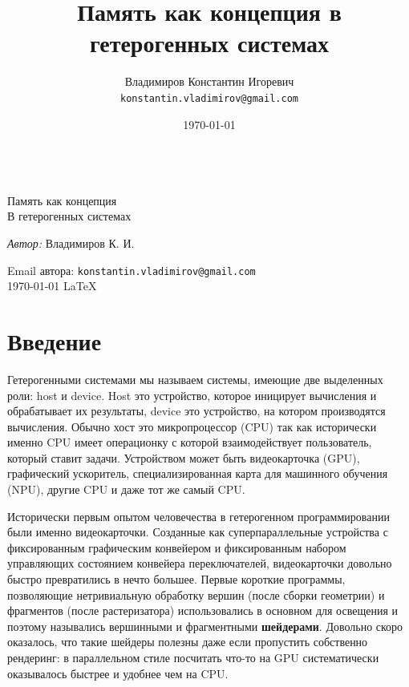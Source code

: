 \documentclass[a4paper,12pt,oneside]{article}
\title{Память как концепция в гетерогенных системах}
\author{
  Владимиров Константин Игоревич\\
  \texttt{konstantin.vladimirov@gmail.com}
}
\date{\today}
\begin{document}
\begin{titlepage}
\begin{center}

\large ~ \\[4.5cm]

\huge Память как концепция\\[0.6cm]
\large В гетерогенных системах\\[3.7cm]

\begin{minipage}{0.5\textwidth}
\begin{flushleft}
\emph{Автор:} Владимиров К. И.\\
\end{flushleft}
\end{minipage}
\vfill
Email автора: \texttt{konstantin.vladimirov@gmail.com}\\
{\large \today}
{\large \LaTeX}

\end{center}
\thispagestyle{empty}
\end{titlepage}

\tableofcontents

\section{Введение}\label{sec:Intro}

Гетерогенными системами мы называем системы, имеющие две выделенных роли: host и device. Host это устройство, которое иницирует вычисления и обрабатывает их результаты, device это устройство, на котором производятся вычисления.
Обычно хост это микропроцессор (CPU) так как исторически именно CPU имеет операционку с которой взаимодействует пользователь, который ставит задачи.
Устройством может быть видеокарточка (GPU), графический ускоритель, специализированная карта для машинного обучения (NPU), другие CPU и даже тот же самый CPU.

Исторически первым опытом человечества в гетерогенном программировании были именно видеокарточки.
Созданные как суперпараллельные устройства с фиксированным графическим конвейером и фиксированным набором управляющих состоянием конвейера переключателей, видеокарточки довольно быстро превратились в нечто большее.
Первые короткие программы, позволяющие нетривиальную обработку вершин (после сборки геометрии) и фрагментов (после растеризатора) использовались в основном для освещения и поэтому назывались вершинными и фрагментными \textbf{шейдерами}.
Довольно скоро оказалось, что такие шейдеры полезны даже если пропустить собственно рендеринг: в параллельном стиле посчитать что-то на GPU систематически оказывалось быстрее и удобнее чем на CPU.
\end{document}
